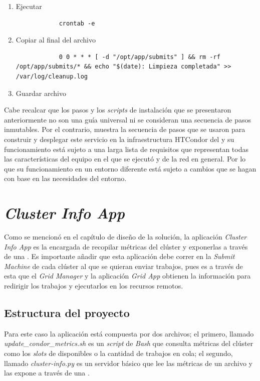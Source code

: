 \begin{enumerate}
	\item Ejecutar
	      \begin{verbatim}
			crontab -e
		\end{verbatim}
	\item Copiar al final del archivo
	      \begin{verbatim}
			0 0 * * * [ -d "/opt/app/submits" ] && rm -rf /opt/app/submits/* && echo "$(date): Limpieza completada" >> /var/log/cleanup.log
		\end{verbatim}
	\item Guardar archivo
\end{enumerate}

Cabe recalcar que los pasos y los \textit{scripts} de instalación que se presentaron anteriormente no son una guía universal ni se consideran una secuencia de pasos inmutables. Por el contrario, muestra la secuencia de pasos que se usaron para construir y desplegar este servicio en la infraestructura HTCondor del \GRID y su funcionamiento está sujeto a una larga lista de requisitos que representan todas las características del equipo en el que se ejecutó y de la red en general. Por lo que su funcionamiento en un entorno diferente está sujeto a cambios que se hagan con base en las necesidades del entorno.

\section{\textit{Cluster Info App}}
\noindent

Como se mencionó en el capítulo de diseño de la solución, la aplicación \textit{Cluster Info App} es la encargada de recopilar métricas del clúster y exponerlas a través de una \API. Es importante añadir que esta aplicación debe correr en la \textit{Submit Machine} de cada clúster al que se quieran enviar trabajos, pues es a través de esta que el \textit{Grid Manager} y la aplicación \textit{Grid App} obtienen la información para redirigir los trabajos y ejecutarlos en los recursos remotos.

\subsection{Estructura del proyecto}
\noindent
Para este caso la aplicación está compuesta por dos archivos; el primero, llamado \textit{update\_condor\_metrics.sh} es un \textit{script} de \textit{Bash} que consulta métricas del clúster como los \textit{slots} de \CPU disponibles o la cantidad de trabajos en cola; el segundo, llamado \textit{cluster-info.py} es un servidor \HTTP básico que lee las métricas de un archivo y las expone a través de una \API.


